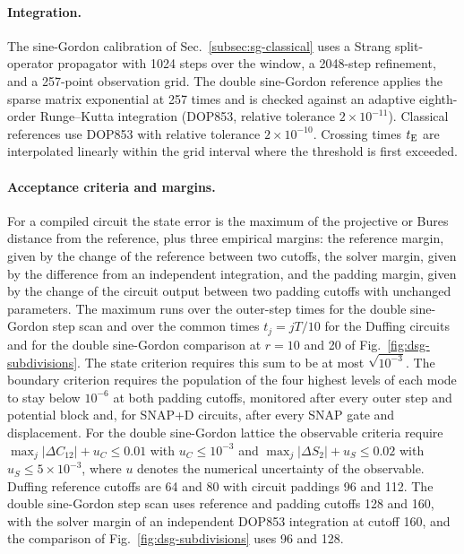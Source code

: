 \documentclass[pra,twocolumn,superscriptaddress,nofootinbib,floatfix]{revtex4-2}
\theoremstyle{remark}
\newcommand{\revcolor}{\color{blue}}
\DeclareRobustCommand{\rev}[1]{{\revcolor #1}}
\begin{document}
\paragraph{\rev{Integration.}}
\rev{The sine-Gordon calibration of Sec.~\ref{subsec:sg-classical} uses a Strang split-operator propagator with 1024 steps over the window, a 2048-step refinement, and a 257-point observation grid.} \rev{The double sine-Gordon reference applies the sparse matrix exponential at 257 times and is checked against an adaptive eighth-order Runge--Kutta integration (DOP853, relative tolerance \(2\times10^{-11}\)).} \rev{Classical references use DOP853 with relative tolerance \(2\times10^{-10}\).} \rev{Crossing times \(t_{\rm E}\) are interpolated linearly within the grid interval where the threshold is first exceeded.}

\paragraph{\rev{Acceptance criteria and margins.}}
\rev{For a compiled circuit the state error is the maximum of the projective or Bures distance from the reference, plus three empirical margins: the reference margin, given by the change of the reference between two cutoffs, the solver margin, given by the difference from an independent integration, and the padding margin, given by the change of the circuit output between two padding cutoffs with unchanged parameters.} \rev{The maximum runs over the outer-step times for the double sine-Gordon step scan and over the common times \(t_j=jT/10\) for the Duffing circuits and for the double sine-Gordon comparison at \(r=10\) and 20 of Fig.~\ref{fig:dsg-subdivisions}.} \rev{The state criterion requires this sum to be at most \(\sqrt{10^{-3}}\).} \rev{The boundary criterion requires the population of the four highest levels of each mode to stay below \(10^{-6}\) at both padding cutoffs, monitored after every outer step and potential block and, for SNAP+D circuits, after every SNAP gate and displacement.} \rev{For the double sine-Gordon lattice the observable criteria require \(\max_j|\Delta C_{12}|+u_C\le0.01\) with \(u_C\le10^{-3}\) and \(\max_j|\Delta S_2|+u_S\le0.02\) with \(u_S\le5\times10^{-3}\), where \(u\) denotes the numerical uncertainty of the observable.} \rev{Duffing reference cutoffs are 64 and 80 with circuit paddings 96 and 112.} \rev{The double sine-Gordon step scan uses reference and padding cutoffs 128 and 160, with the solver margin of an independent DOP853 integration at cutoff 160, and the comparison of Fig.~\ref{fig:dsg-subdivisions} uses 96 and 128.}
\end{document}
